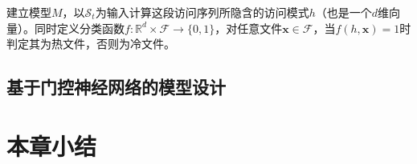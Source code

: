 建立模型$M$，以$\mathcal{S}_t$为输入计算这段访问序列所隐含的访问模式$h$（也是一个$d$维向量）。同时定义分类函数$f:\mathbb{R}^d \times \mathcal{F} \rightarrow \{0,1\}$，对任意文件$\mathbf{x} \in \mathcal{F}$，当$f(h,\mathbf{x})=1$时判定其为热文件，否则为冷文件。
\subsection{基于门控神经网络的模型设计}


\section{本章小结}